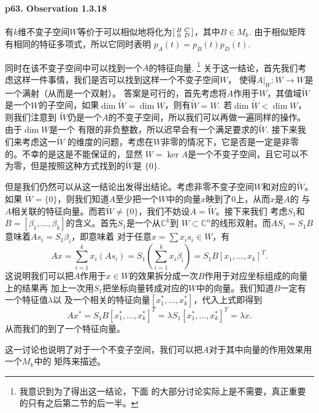   \paragraph{p63. Observation 1.3.18}
    有$k$维不变子空间$W$等价于可以相似地将化为$\begin{bsmallmatrix}B & C \\ 0 & D
    \end{bsmallmatrix}$，其中$B\in M_k$. 由于相似矩阵有相同的特征多项式，所以它同时表明
    $p_A(t)=p_B(t)p_D(t)$. \par
    同时在该不变子空间中可以找到一个$A$的特征向量. \footnote{我意识到为了得出这一结论，下面
    的大部分讨论实际上是不需要，真正重要的只有之后第二节的后一半。}
    关于这一结论，首先我们考虑这样一件事情，我们是否可以找到这样一个不变子空间$W$，
    使得$A|_W:W\to W$是一个满射（从而是一个双射）。
    答案是可行的，首先考虑将$A$作用于$W$，其值域$\tilde{W}$是一个$W$的子空间，如果$\dim
    \tilde{W}=\dim W$，则有$\tilde{W}=W$. 若$\dim\tilde{W}<\dim W$，则我们注意到
    $\tilde{W}$仍是一个$A$的不变子空间，所以我们可以再做一遍同样的操作。由于$\dim W$是一个
    有限的非负整数，所以迟早会有一个满足要求的$\tilde{W}$. 接下来我们来考虑这一$\tilde{W}$
    的维度的问题，考虑在$W$非零的情况下，它是否是一定是非零的。不幸的是这是不能保证的，显然
    $W=\ker A$是一个不变子空间，且它可以不为零，但是按照这种方式找到的$\tilde{W}$是
    $\{0\}$. \par
    但是我们仍然可以从这一结论出发得出结论。考虑非零不变子空间$W$和对应的$\tilde{W}$。如果
    $\tilde{W}=\{0\}$，则我们知道$A$至少把一个$W$中的向量$x$映到了$0$上，从而$x$是$A$的
    与$A$相关联的特征向量。而若$\tilde{W}\ne\{0\}$，我们不妨设$A=\tilde{W}$。接下来我们
    考虑$S_1$和$B=[\beta_1,\dots,\beta_k]$的含义。首先$S_1$是一个从$\mathbb{C}^k$到
    $W\subset\mathbb{C}^n$的线形双射。而$AS_1=S_1B$意味着$As_i=S_1\beta_i$，即意味着
    对于任意$x=\sum x_is_i \in W$，有
    \[
      Ax = \sum_{i=1}^k x_i(As_i) = 
      S_1\left( \sum_{i=1}^k x_i\beta_i \right) = S_1B[x_1,\dots,x_k]^T.
    \]
    这说明我们可以把$A$作用于$x\in W$的效果拆分成一次$B$作用于对应坐标组成的向量上的结果再
    加上一次用$S_1$把坐标向量转成对应的$W$中的向量。我们知道$B$一定有一个特征值$\lambda$以
    及一个相关的特征向量$[x_1^*, \dots, x_k^*]$，代入上式即得到
    \[
      Ax^*= S_1B[x_1^*,\dots,x_k^*]^T = \lambda S_1[x_1^*,\dots,x_k^*]^T
      =\lambda x.
    \]
    从而我们的到了一个特征向量。\par
    这一讨论也说明了对于一个不变子空间，我们可以把$A$对于其中向量的作用效果用一个$M_k$中的
    矩阵来描述。
